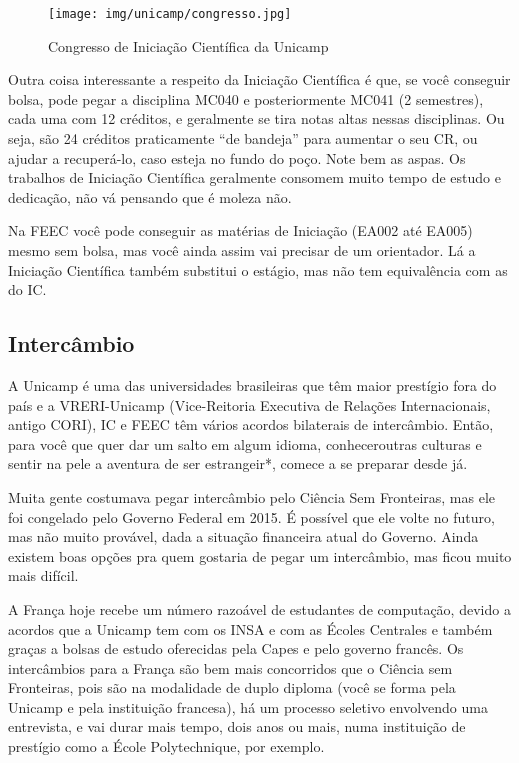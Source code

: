 \begin{figure}[h!]
    \centering
    \texttt{[image: img/unicamp/congresso.jpg]}
    \caption*{Congresso de Iniciação Científica da Unicamp}
\end{figure}

Outra coisa interessante a respeito da Iniciação Científica é que, se você
conseguir bolsa, pode pegar a disciplina MC040 e posteriormente MC041 (2 semestres),
cada uma com 12 créditos, e geralmente se tira notas altas nessas disciplinas.
Ou seja, são 24 créditos praticamente ``de bandeja'' para aumentar o seu CR,
ou ajudar a recuperá-lo, caso esteja no fundo do poço. Note bem as aspas.
Os trabalhos de Iniciação Científica geralmente consomem muito tempo de estudo
e dedicação, não vá pensando que é moleza não.

Na FEEC você pode conseguir as matérias de Iniciação (EA002 até EA005) mesmo sem
bolsa, mas você ainda assim vai precisar de um orientador. Lá a Iniciação
Científica também substitui o estágio, mas não tem equivalência com as do IC.

\subsection{Intercâmbio}

A Unicamp é uma das universidades brasileiras que têm maior prestígio fora do
país e a VRERI-Unicamp (Vice-Reitoria Executiva de Relações Internacionais,
antigo CORI), IC e FEEC têm vários acordos bilaterais de intercâmbio. Então,
para você que quer dar um salto em algum idioma, conheceroutras culturas e
sentir na pele a aventura de ser estrangeir*, comece a se preparar desde já.

Muita gente costumava pegar intercâmbio pelo Ciência Sem Fronteiras, mas ele foi
congelado pelo Governo Federal em 2015. É possível que ele volte no futuro, mas
não muito provável, dada a situação financeira atual do Governo. Ainda existem
boas opções pra quem gostaria de pegar um intercâmbio, mas ficou muito mais
difícil.

A França hoje recebe um número razoável de estudantes de computação, devido a
acordos que a Unicamp tem com os INSA e com as Écoles Centrales e também graças
a bolsas de estudo oferecidas pela Capes e pelo governo francês. Os intercâmbios
para a França são bem mais concorridos que o Ciência sem Fronteiras, pois são na
modalidade de duplo diploma (você se forma pela Unicamp e pela instituição
francesa), há um processo seletivo envolvendo uma entrevista, e vai durar mais
tempo, dois anos ou mais, numa instituição de prestígio como a École
Polytechnique, por exemplo.

